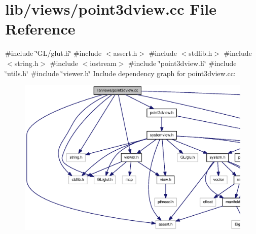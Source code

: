 \section{lib/views/point3dview.cc \-File \-Reference}
\label{point3dview_8cc}
{\ttfamily \#include \char`\"{}\-G\-L/glut.\-h\char`\"{}}\*
{\ttfamily \#include $<$assert.\-h$>$}\*
{\ttfamily \#include $<$stdlib.\-h$>$}\*
{\ttfamily \#include $<$string.\-h$>$}\*
{\ttfamily \#include $<$iostream$>$}\*
{\ttfamily \#include \char`\"{}point3dview.\-h\char`\"{}}\*
{\ttfamily \#include \char`\"{}utils.\-h\char`\"{}}\*
{\ttfamily \#include \char`\"{}viewer.\-h\char`\"{}}\*
\-Include dependency graph for point3dview.\-cc\-:
\nopagebreak
\begin{figure}[H]
\begin{center}
\leavevmode
\includegraphics[width=350pt]{point3dview_8cc__incl}
\end{center}
\end{figure}

